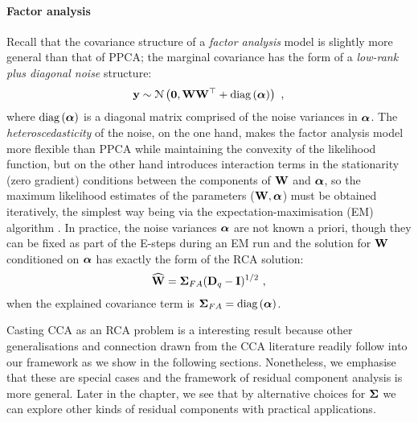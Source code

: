       \paragraph{Factor analysis}
      Recall that the covariance structure of a \textit{factor analysis} model \citep{Bartholomew:factor11, Basilevsky:factor94} is slightly more general than that of PPCA; the marginal covariance has the form of a \textit{low-rank plus diagonal noise} structure:
      \[
	\mathbf{y} \sim \mathcal{N} \left(  \mathbf{0} ,  \mathbf{W}\mathbf{W}^\top + \textrm{diag}\left( \boldsymbol{\alpha} \right)  \right) ~,
      \]
      where $\textrm{diag}\left( \boldsymbol{\alpha} \right)$ is a diagonal matrix comprised of the noise variances in $\boldsymbol{\alpha}$. The \textit{heteroscedasticity} of the noise, on the one hand, makes the factor analysis model more flexible than PPCA while maintaining the convexity of the likelihood function, but on the other hand introduces interaction terms in the stationarity (zero gradient) conditions between the components of $\mathbf{W}$ and $\boldsymbol{\alpha}$, so the maximum likelihood estimates of the parameters ($\mathbf{W},\boldsymbol{\alpha}$) must be obtained iteratively, the simplest way being via the expectation-maximisation (EM) algorithm \citep{Rubin:EMFA82}. In practice, the noise variances $\boldsymbol{\alpha}$ are not known a priori, though they can be fixed as part of the E-steps during an EM run and the solution for $\mathbf{W}$ conditioned on $\boldsymbol{\alpha}$ has exactly the form of the RCA solution:
      \[
	\widehat{\mathbf{W}} = \mathbf{\Sigma}_{FA} (\mathbf{D}_q - \mathbf{I})^{1/2} ~,
      \]
      when the explained covariance term is $\mathbf{\Sigma}_{FA} = \textrm{diag}\left( \boldsymbol{\alpha} \right)$.

      Casting CCA as an RCA problem is a interesting result because other generalisations and connection drawn from the CCA literature readily follow into our framework as we show in the following sections. Nonetheless, we emphasise that these are special cases and the framework of residual component analysis is more general. Later in the chapter, we see that by alternative choices for $\mathbf{\Sigma}$ we can explore other kinds of residual components with practical applications.



